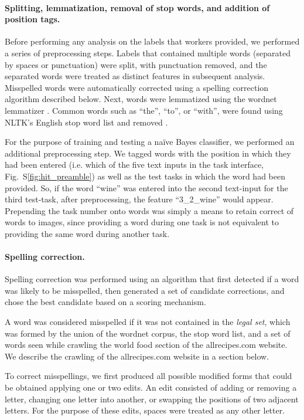 \documentclass[12pt]{article}
\begin{document}
	\paragraph{Splitting, lemmatization, removal of stop words, and 
		addition of position tags.} 

	Before performing any analysis on the labels that workers provided, we
	performed a series of preprocessing steps.  
	Labels that contained
	multiple words (separated by spaces or punctuation) were split, with
	punctuation removed, and the separated words were treated as distinct 
	features in subsequent analysis.
	Misspelled words were automatically corrected using a spelling 
	correction algorithm described below.  
	Next, words were lemmatized using the
	wordnet lemmatizer \cite{miller1995wordnet,felbaum1998wordnet}.  
	Common words such as ``the'', ``to'', or ``with'', were found using
	NLTK's English stop word list and removed \cite{loper2002nltk}.  

	For the purpose of training and testing a na\"ive Bayes classifier, we 
	performed an additional preprocessing step.  We tagged words with the
	position in which they had been entered (i.e. which of the five text 
	inputs in the task interface, Fig.~S\ref{fig:hit_preamble}) 
	as well as the test tasks in which the word had been provided.
	So, if the word ``wine'' was entered into the second text-input for 
	the third test-task, after preprocessing, the feature ``3\_2\_wine'' would
	appear.  Prepending the task number onto words was simply a means to 
	retain correct of words to images, since providing a word during one task 
	is not equivalent to providing the same word during another task.  
	
	\paragraph{Spelling correction.}  
	Spelling correction was performed using an algorithm that first detected
	if a word was likely to be misspelled, then generated a set of candidate 
	corrections, and chose the best candidate based on a scoring mechanism.
	
	A word was considered misspelled if it was not contained in the 
	\textit{legal set}, which was formed by the union of
	the wordnet corpus, the stop word list, and a set of words seen while 
	crawling the world food section of the allrecipes.com website.  We
	describe the crawling of the allrecipes.com website in a section below.

	To correct misspellings, we first produced all possible modified forms 
	that could be obtained applying one or two edits.  An edit consisted of 
	adding or removing a letter, changing one letter into another, or 
	swapping the positions of two adjacent letters.  For the purpose of these 
	edits, spaces were treated as any other letter.
\end{document}
